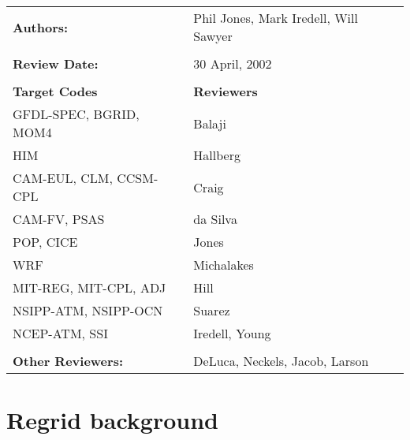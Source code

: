 \begin{tabular}{l l}

{\bf Authors:} & Phil Jones, Mark Iredell, Will Sawyer \\ \\

{\bf Review Date:}            & 30 April, 2002 \\ \\

{\bf Target Codes}            & {\bf Reviewers} \\
GFDL-SPEC, BGRID, MOM4        & Balaji \\
HIM                           & Hallberg \\
CAM-EUL, CLM, CCSM-CPL        & Craig \\
CAM-FV, PSAS                  & da Silva\\
POP, CICE                     & Jones \\
WRF                           & Michalakes \\
MIT-REG, MIT-CPL, ADJ         & Hill \\
NSIPP-ATM, NSIPP-OCN          & Suarez \\
NCEP-ATM, SSI                 & Iredell, Young \\ \\

{\bf Other Reviewers:}        & DeLuca, Neckels, Jacob, Larson

\end{tabular}


%

\section{Regrid background}


%

%

